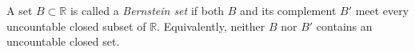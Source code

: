 A set $B \subset \mathbb{R}$ is called a \emph{Bernstein set} if both $B$ and its complement $B'$ meet every uncountable closed subset of $\mathbb{R}$. Equivalently, neither $B$ nor $B'$ contains an uncountable closed set.
